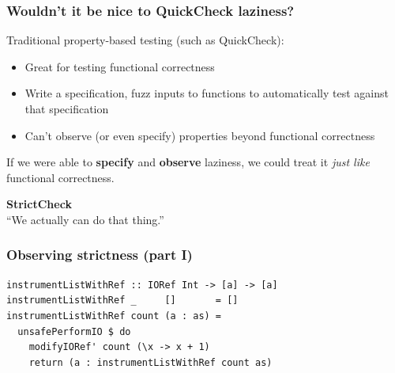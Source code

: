 \documentclass{beamer}
\newcommand{\greentick}[0]{\color{forestgreen}\ding{51}}
\newcommand{\redcross}[0]{\color{red}\ding{55}}
\begin{document}
\begin{frame}
\frametitle{Wouldn't it be nice to QuickCheck laziness?}
Traditional property-based testing (such as QuickCheck):
\begin{itemize}
\item[\greentick] Great for testing functional correctness
\item[\greentick] Write a specification, fuzz inputs to functions to automatically test against that specification
\item[\redcross] Can't observe (or even specify) properties beyond functional correctness
\end{itemize}
If we were able to \textbf{specify} and \textbf{observe} laziness, we could
treat it \emph{just like} functional correctness.
\end{frame}


\begin{frame}
\Huge\centering\textbf{StrictCheck}\vspace{.15\baselineskip}\\
\Large\centering``We actually can do that thing.''
\end{frame}

\begin{frame}[fragile]
\frametitle{Observing strictness (part I)}
\begin{verbatim}
instrumentListWithRef :: IORef Int -> [a] -> [a]
instrumentListWithRef _     []       = []
instrumentListWithRef count (a : as) =
  unsafePerformIO $ do
    modifyIORef' count (\x -> x + 1)
    return (a : instrumentListWithRef count as)
\end{verbatim}
\end{frame}

\end{document}
